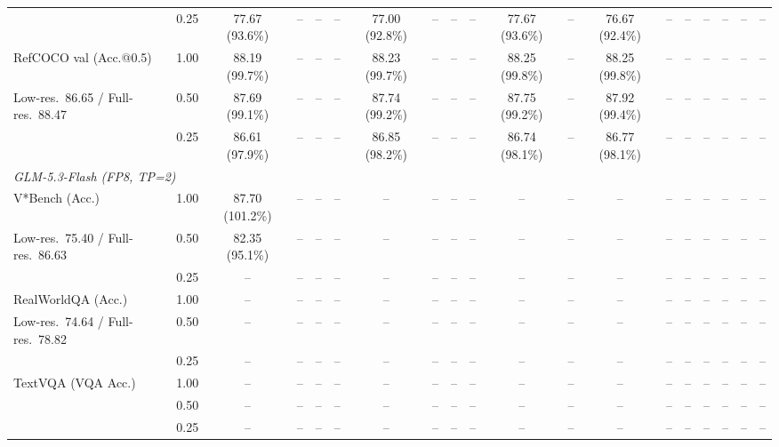 \begin{table}[t]
{\begin{tabular}{l c | c c c c | c c c c | c c | c c c | c c c c}
 & 0.25 & 77.67 (93.6\%) & -- & -- & -- & 77.00 (92.8\%) & -- & -- & -- & 77.67 (93.6\%) & -- & 76.67 (92.4\%) & -- & -- & -- & -- & -- & -- \\
\cmidrule(lr){1-19}
RefCOCO val (Acc.@0.5) & 1.00 & \cellcolor{gray!15}88.19 (99.7\%) & -- & -- & -- & \cellcolor{gray!15}88.23 (99.7\%) & -- & -- & -- & \cellcolor{gray!15}88.25 (99.8\%) & -- & \cellcolor{gray!15}88.25 (99.8\%) & -- & -- & -- & -- & -- & -- \\
{\footnotesize Low-res.\ 86.65 / Full-res.\ 88.47} & 0.50 & \cellcolor{gray!15}87.69 (99.1\%) & -- & -- & -- & \cellcolor{gray!15}87.74 (99.2\%) & -- & -- & -- & \cellcolor{gray!15}87.75 (99.2\%) & -- & \cellcolor{gray!15}87.92 (99.4\%) & -- & -- & -- & -- & -- & -- \\
 & 0.25 & 86.61 (97.9\%) & -- & -- & -- & \cellcolor{gray!15}86.85 (98.2\%) & -- & -- & -- & \cellcolor{gray!15}86.74 (98.1\%) & -- & \cellcolor{gray!15}86.77 (98.1\%) & -- & -- & -- & -- & -- & -- \\
\midrule
\multicolumn{19}{l}{\emph{GLM-5.3-Flash (FP8, TP=2)}} \\
V*Bench (Acc.) & 1.00 & \cellcolor{gray!15}87.70 (101.2\%) & -- & -- & -- & -- & -- & -- & -- & -- & -- & -- & -- & -- & -- & -- & -- & -- \\
{\footnotesize Low-res.\ 75.40 / Full-res.\ 86.63} & 0.50 & 82.35 (95.1\%) & -- & -- & -- & -- & -- & -- & -- & -- & -- & -- & -- & -- & -- & -- & -- & -- \\
 & 0.25 & -- & -- & -- & -- & -- & -- & -- & -- & -- & -- & -- & -- & -- & -- & -- & -- & -- \\
\cmidrule(lr){1-19}
RealWorldQA (Acc.) & 1.00 & -- & -- & -- & -- & -- & -- & -- & -- & -- & -- & -- & -- & -- & -- & -- & -- & -- \\
{\footnotesize Low-res.\ 74.64 / Full-res.\ 78.82} & 0.50 & -- & -- & -- & -- & -- & -- & -- & -- & -- & -- & -- & -- & -- & -- & -- & -- & -- \\
 & 0.25 & -- & -- & -- & -- & -- & -- & -- & -- & -- & -- & -- & -- & -- & -- & -- & -- & -- \\
\cmidrule(lr){1-19}
TextVQA (VQA Acc.) & 1.00 & -- & -- & -- & -- & -- & -- & -- & -- & -- & -- & -- & -- & -- & -- & -- & -- & -- \\
 & 0.50 & -- & -- & -- & -- & -- & -- & -- & -- & -- & -- & -- & -- & -- & -- & -- & -- & -- \\
 & 0.25 & -- & -- & -- & -- & -- & -- & -- & -- & -- & -- & -- & -- & -- & -- & -- & -- & -- \\

\end{tabular}}
\end{table}
